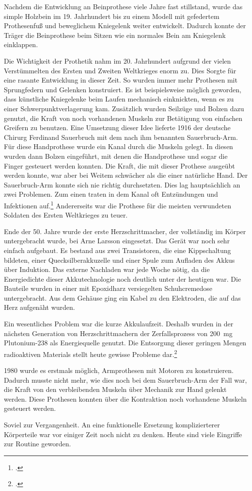 Nachdem die Entwicklung an Beinprothese viele Jahre fast stillstand, wurde das simple Holzbein im 19.
Jahrhundert bis zu einem Modell mit gefedertem Prothesenfuß und beweglichem Kniegelenk weiter
entwickelt. Dadurch konnte der Träger die Beinprothese beim Sitzen wie ein normales Bein am
Kniegelenk einklappen.

Die Wichtigkeit der Prothetik nahm im 20. Jahrhundert aufgrund der vielen Verstümmelten des Ersten
und Zweiten Weltkrieges enorm zu. Dies Sorgte für eine rasante Entwicklung in dieser Zeit. So wurden
immer mehr Prothesen mit Sprungfedern und Gelenken konstruiert. Es ist beispielsweise möglich
geworden, dass künstliche Kniegelenke beim Laufen mechanisch einknickten, wenn es zu einer
Schwerpunktverlagerung kam. Zusätzlich wurden Seilzüge und Bolzen dazu genutzt, die Kraft von noch
vorhandenen Muskeln zur Betätigung von einfachen Greifern zu benutzen. Eine Umsetzung dieser Idee
lieferte 1916 der deutsche Chirurg Ferdinand Sauerbruch mit dem nach ihm benannten Sauerbruch-Arm.
Für diese Handprothese wurde ein Kanal durch die Muskeln gelegt. In diesen wurden dann Bolzen
eingeführt, mit denen die Handprothese und sogar die Finger gesteuert werden konnten. Die Kraft, die
mit dieser Prothese ausgeübt werden konnte, war aber bei Weitem schwächer als die einer natürliche
Hand. Der Sauerbruch-Arm konnte sich nie richtig durchsetzten. Dies lag hauptsächlich an zwei
Problemen. Zum einen traten in dem Kanal oft Entzündungen und Infektionen
auf.\footcite{thesis:Karpa:Geschichte_Armprothesen}
Andererseits war die
Prothese für die meisten verwundeten Soldaten des Ersten Weltkrieges zu teuer.

Ende der 50. Jahre wurde der erste Herzschrittmacher, der vollständig im Körper untergebracht wurde,
bei Arne Larsson eingesetzt. Das Gerät war noch sehr einfach aufgebaut. Es bestand aus zwei
Transistoren, die eine Kippschaltung bildeten, einer Quecksilberakkuzelle und einer Spule zum
Aufladen des Akkus über Induktion. Das externe Nachladen war jede Woche nötig, da die Energiedichte
dieser Akkutechnologie noch deutlich unter der heutigen war. Die Bauteile wurden in einer mit
Epoxidharz versiegelten Schuhcremedose untergebracht. Aus dem Gehäuse ging ein Kabel zu den
Elektroden, die auf das Herz aufgenäht wurden.

Ein wesentliches Problem war die kurze Akkulaufzeit. Deshalb wurden in der nächsten Generation
von Herzschrittmachern der Zerfallsprozess von \SI{200}{\milli\gram} Plutonium-238 als Energiequelle
genutzt. Die Entsorgung dieser geringen Mengen radioaktiven
Materials stellt heute gewisse Probleme dar.\footcite{DRadio:strahlendes_Herz}

1980 wurde es erstmals möglich, Armprothesen mit Motoren zu konstruieren. Dadurch musste nicht mehr,
wie dies noch bei dem Sauerbruch-Arm der Fall war, die Kraft von den verbleibenden Muskeln über
Mechanik zur Hand gelenkt werden. Diese Prothesen konnten über die Kontraktion noch vorhandene
Muskeln gesteuert werden.

\bigskip
Soviel zur Vergangenheit. An eine funktionelle Ersetzung komplizierterer Körperteile war vor einiger
Zeit noch nicht zu denken. Heute sind viele Eingriffe zur Routine geworden.
